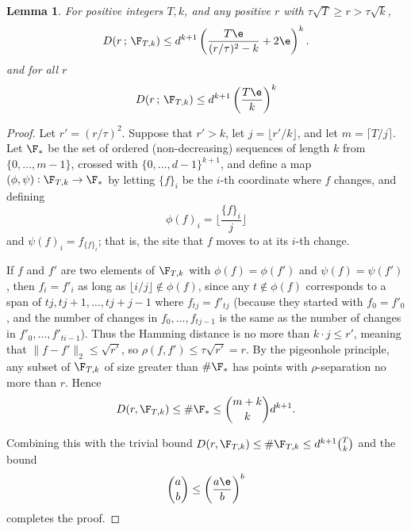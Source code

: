 \documentclass[11pt]{amsart}
\newtheorem{lemma}[Thm]{Lemma}
\begin{document}
\begin{lemma} \label{L:packingbound}
For positive integers $T,k$, and any positive $r$ with $\tau\sqrt{T} \ge r > \tau \sqrt{k}$,
\begin{equation}  \label{E:packingbound}
D(r \, ;\, \F_{T,k})\le d^{k+1} \left( \frac{T\e}{(r/\tau)^{2}-k}+2\e \right)^{k}.
\end{equation}
and for all $r$
\begin{equation} \label{E:packingbound2}
D(r \, ;\, \F_{T,k}) \le d^{k+1}\left( \frac{T\e}{k} \right)^k
\end{equation}
\end{lemma}

\begin{proof}
Let $r'=(r/\tau)^{2}$. Suppose that $r'>k$, let $j=\lfloor r'/k\rfloor$, and let $m=\lceil T/j\rceil$. Let $\F_{*}$ be the set of ordered (non-decreasing) sequences
of length $k$ from $\{0,\dots,m-1\}$, crossed with $\{0,\dots,d-1\}^{k+1}$, 
and define a map $(\phi,\psi):\F_{T,k}\to \F_{*}$ 
by letting $\{f\}_{i}$ be the $i$-th coordinate where $f$ changes, and defining
$$
\phi(f)_{i}= \bigl\lfloor \frac{\{f\}_{i}}{j}  \bigr\rfloor
$$
and $\psi(f)_{i}=f_{\{f\}_{i}}$; that is, the site that $f$ moves to at its $i$-th
change.

If $f$ and $f'$ are two elements of $\F_{T,k}$ with $\phi(f)=\phi(f')$
and $\psi(f)=\psi(f')$, 
then $f_{i}=f'_{i}$ as long as $\lfloor i/j\rfloor\notin \phi(f)$, 
since any $t\notin \phi(f)$ corresponds to a span of $tj,tj+1,\dots,tj+j-1$
where $f_{tj}=f'_{tj}$ (because they started with $f_{0}=f'_{0}$, and the number
of changes in $f_{0},\dots,f_{tj-1}$ is the same as the number
of changes in $f'_{0},\dots,f'_{ti-1}$). 
Thus the Hamming distance is no more than $k\cdot j \le r'$, meaning that $\|f-f'\|_{2}\le\sqrt{r'}$, so $\rho(f,f')\le \tau\sqrt{r'}=r$. By the
pigeonhole principle, any subset of $\F_{T,k}$ of size greater than $\# \F_{*}$
has points with $\rho$-separation no more than $r$. Hence
$$
D(r,\F_{T,k})\le \#\F_{*} \le \binom{m+k}{k} d^{k+1}.
$$

Combining this with the trivial bound $D(r,\F_{T,k})\le \#\F_{T,k}\le d^{k+1}\binom{T}{k}$ and the bound
$$
\binom{a}{b}\le \left(\frac{a\e}{b}\right)^{b}
$$
completes the proof.
\end{proof}
\end{document}
